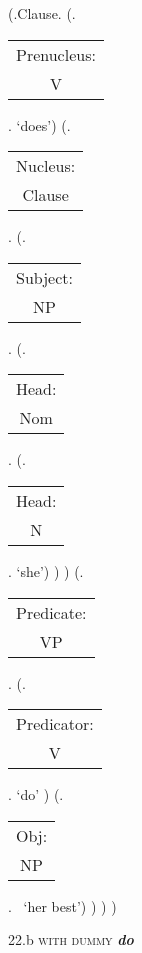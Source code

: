 \documentclass[12pt,letterpaper]{article}
\begin{document}
\begin{figure}
	\begin{center}
		\begin{parsetree}
			(.Clause.
			(.\begin{tabular}{c}Prenucleus:\\V\end{tabular}. `does')
			(.\begin{tabular}{c}Nucleus:\\Clause\end{tabular}.    
			(.\begin{tabular}{c}Subject:\\NP\end{tabular}.  
			(.\begin{tabular}{c}Head:\\Nom\end{tabular}.
			(.\begin{tabular}{c}Head:\\N\end{tabular}. `she')
			)
			)
			(.\begin{tabular}{c}Predicate:\\VP\end{tabular}.
			(.\begin{tabular}{c}Predicator:\\V\end{tabular}. `do' )
			(.\begin{tabular}{c}Obj:\\NP\end{tabular}.  ~`her best')
			)
			)
			)
			
		\end{parsetree}
		\hfill \break \hfill \break
		22.b \textsc{with dummy} \textit{\textbf{do}}
	\end{center}
\end{figure}
\end{document}
